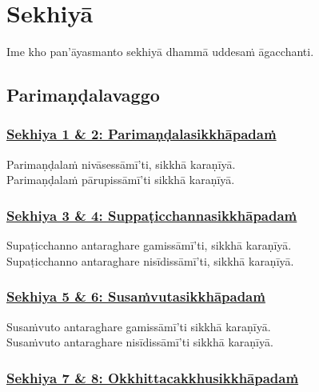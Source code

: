
\section{Sekhiyā}
\label{sekh}

\begin{intro}
	Ime kho pan'āyasmanto sekhiyā dhammā uddesaṁ āgacchanti.
\end{intro}

\setsubsecheadstyle{\subsectionFmt}
\subsection{Parimaṇḍalavaggo}

\subsubsection*{\hyperref[training1-2]{Sekhiya 1 \& 2: Parimaṇḍalasikkhāpadaṁ}}
\label{sekh1-2}

Parimaṇḍalaṁ nivāsessāmī'ti, sikkhā karaṇīyā.\\
Parimaṇḍalaṁ pārupissāmī'ti sikkhā karaṇīyā.



\subsubsection*{\hyperref[training3-4]{Sekhiya 3 \& 4: Suppaṭicchannasikkhāpadaṁ}}
\label{sekh3-4}

Supaṭicchanno antaraghare gamissāmī'ti, sikkhā karaṇīyā.\\
Supaṭicchanno antaraghare nisīdissāmī'ti, sikkhā karaṇīyā.



\subsubsection*{\hyperref[training5-6]{Sekhiya 5 \& 6: Susaṁvutasikkhāpadaṁ}}
\label{sekh5-6}

Susaṁvuto antaraghare gamissāmī'ti sikkhā karaṇīyā.\\
Susaṁvuto antaraghare nisīdissāmī'ti sikkhā karaṇīyā.



\subsubsection*{\hyperref[training7-8]{Sekhiya 7 \& 8: Okkhittacakkhusikkhāpadaṁ}}
\label{sekh7-8}

